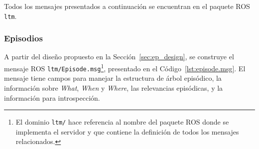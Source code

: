Todos los mensajes presentados a continuación se encuentran en el paquete ROS \texttt{ltm}.

\subsubsection{Episodios}

A partir del diseño propuesto en la Sección~\ref{sec:ep_design}, se construye el mensaje ROS \texttt{ltm/Episode.msg}\footnote{El dominio \texttt{ltm/} hace referencia al nombre del paquete ROS donde se implementa el servidor y que contiene la definición de todos los mensajes relacionados.}, presentado en el Código~\ref{lst:episode.msg}. El mensaje tiene campos para manejar la estructura de árbol episódico, la información sobre \textit{What}, \textit{When} y \textit{Where}, las relevancias episódicas, y la información para introspección.
\lstset{style=/Style/ROS/MSG}



